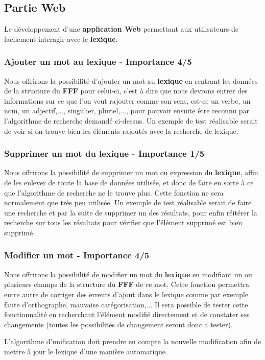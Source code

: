 \subsection{Partie Web}
Le développement d'une \textbf{application Web} permettant aux utilisateurs de facilement interagir avec le \textbf{lexique}.

\subsubsection{Ajouter un mot au lexique - Importance 4/5}

{Nous offrirons la possibilité d'ajouter un mot au \textbf{lexique} en rentrant les données de la structure du \textbf{FFF} pour celui-ci, c'est à dire que nous devrons entrer des informations sur ce que l'on veut rajouter comme son sens, est-ce un verbe, un nom, un adjectif,..., singulier, pluriel,..., pour pouvoir ensuite être reconnu par l'algorithme de recherche demandé ci-dessus. Un exemple de test réalisable serait de voir si on trouve bien les éléments rajoutés avec la recherche de lexique.\par}

\subsubsection{Supprimer un mot du lexique - Importance 1/5}
{Nous offrirons la possibilité de supprimer un mot ou expression du \textbf{lexique}, affin de les enlever de toute la base de données utilisée, et donc de faire en sorte à ce que l'algorithme de recherche ne le trouve plus. Cette fonction ne sera normalement que très peu utilisée. Un exemple de test réalisable serait de faire une recherche et par la suite de supprimer un des résultats, pour enfin réitérer la recherche sur tous les résultats pour vérifier que l'élément supprimé est bien supprimé.\par}

\subsubsection{Modifier un mot - Importance 4/5}
 
{Nous offrirons la possibilité de modifier un mot du \textbf{lexique} en modifiant un ou plusieurs champs de la structure du \textbf{FFF} de ce mot. Cette fonction permettra entre autre de corriger des erreurs d'ajout dans le lexique comme par exemple faute d'orthographe, mauvaise catégorisation,... Il sera possible de tester cette fonctionnalité en recherchant l'élément modifié directement et de constater ses changements (toutes les possibilités de changement seront donc a tester).\par} L'algorithme d'unification doit prendre en compte la nouvelle modification afin de mettre à jour le lexique d'une manière automatique.
 
